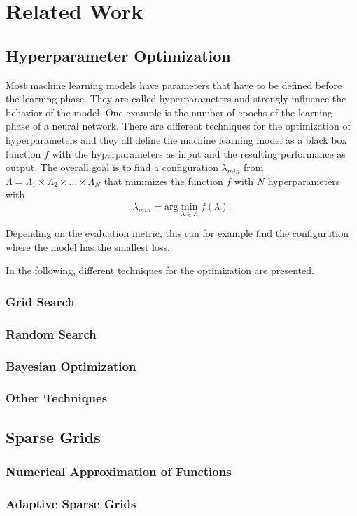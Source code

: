 
\chapter{Related Work}\label{chapter:theoretical_background}

\section{Hyperparameter Optimization}

Most machine learning models have parameters that have to be defined before the learning phase. They are called hyperparameters and strongly influence the behavior of the model. One example is the number of epochs of the learning phase of a neural network. There are different techniques for the optimization of hyperparameters and they all define the machine learning model as a black box function $ f $ with the hyperparameters as input and the resulting performance as output. The overall goal is to find a configuration $ \lambda_{min} $ from $ \Lambda = \Lambda_1 \times \Lambda_2 \times ... \times \Lambda_N $ that minimizes the function $ f $ with $ N $ hyperparameters with 
\begin{equation}
	\lambda_{min} = \text{arg} \min_{\lambda \in \Lambda} f(\lambda) .
\end{equation}

Depending on the evaluation metric, this can for example find the configuration where the model has the smallest loss. 
\cite{feurer2019hyperparameter,bischl2021hyperparameter}

In the following, different techniques for the optimization are presented. 
\subsection{Grid Search}



\subsection{Random Search}

\subsection{Bayesian Optimization}

\subsection{Other Techniques}


\section{Sparse Grids}

\subsection{Numerical Approximation of Functions}

\subsection{Adaptive Sparse Grids}
